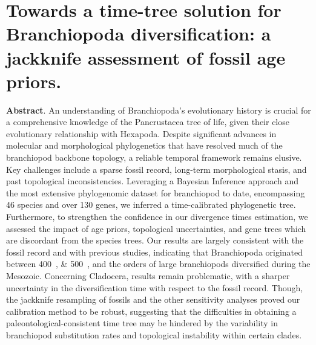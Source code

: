 \clearpage


{
	\section*{\LARGE{Towards a time-tree solution for Branchiopoda diversification: a jackknife assessment of fossil age priors.}}

	\vspace{4mm}


	\vspace{4mm}




	\vspace{4mm}

}

\vspace{4mm}

\textbf{Abstract}. An understanding of Branchiopoda's evolutionary history is crucial for a comprehensive knowledge of the Pancrustacea tree of life, given their close evolutionary relationship with Hexapoda. Despite significant advances in molecular and morphological phylogenetics that have resolved much of the branchiopod backbone topology, a reliable temporal framework remains elusive. Key challenges include a sparse fossil record, long-term morphological stasis, and past topological inconsistencies. Leveraging a Bayesian Inference approach and the most extensive phylogenomic dataset for branchiopod to date, encompassing 46 species and over 130 genes, we inferred a time-calibrated phylogenetic tree. Furthermore, to strengthen the confidence in our divergence times estimation, we assessed the impact of age priors, topological uncertainties, and gene trees which are discordant from the species trees. Our results are largely consistent with the fossil record and with previous studies, indicating that Branchiopoda originated between \qtylist{400;500}{\mya}, and the orders of large branchiopods diversified during the Mesozoic. Concerning Cladocera, results remain problematic, with a sharper uncertainty in the diversification time with respect to the fossil record. Though, the jackknife resampling of fossils and the other sensitivity analyses proved our calibration method to be robust, suggesting that the difficulties in obtaining a paleontological-consistent time tree may be hindered by the variability in branchiopod substitution rates and topological instability within certain clades.

% 